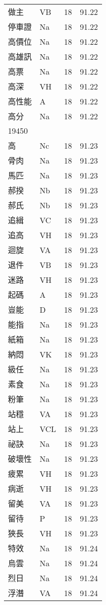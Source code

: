 \documentclass[twocolumn]{book}
\begin{document}
\begin{supertabular}{llrr}
做主 & VB & 18 &  91.22\\
停車證 & Na & 18 &  91.22\\
高價位 & Na & 18 &  91.22\\
高雄訊 & Na & 18 &  91.22\\
高票 & Na & 18 &  91.22\\
高深 & VH & 18 &  91.22\\
高性能 & A & 18 &  91.22\\
高分 & Na & 18 &  91.22\\
19450\\
高 & Nc & 18 &  91.23\\
骨肉 & Na & 18 &  91.23\\
馬匹 & Na & 18 &  91.23\\
郝揆 & Nb & 18 &  91.23\\
郝氏 & Nb & 18 &  91.23\\
追緝 & VC & 18 &  91.23\\
追高 & VH & 18 &  91.23\\
迴旋 & VA & 18 &  91.23\\
退件 & VB & 18 &  91.23\\
迷路 & VH & 18 &  91.23\\
起碼 & A & 18 &  91.23\\
豈能 & D & 18 &  91.23\\
能指 & Na & 18 &  91.23\\
紙箱 & Na & 18 &  91.23\\
納悶 & VK & 18 &  91.23\\
級任 & Na & 18 &  91.23\\
素食 & Na & 18 &  91.23\\
粉筆 & Na & 18 &  91.23\\
站穩 & VA & 18 &  91.23\\
站上 & VCL & 18 &  91.23\\
祕訣 & Na & 18 &  91.23\\
破壞性 & Na & 18 &  91.23\\
疲累 & VH & 18 &  91.23\\
病逝 & VH & 18 &  91.23\\
留美 & VA & 18 &  91.23\\
留待 & P & 18 &  91.23\\
狹長 & VH & 18 &  91.23\\
特效 & Na & 18 &  91.24\\
烏雲 & Na & 18 &  91.24\\
烈日 & Na & 18 &  91.24\\
浮潛 & VA & 18 &  91.24\\

\end{supertabular}
\end{document}
